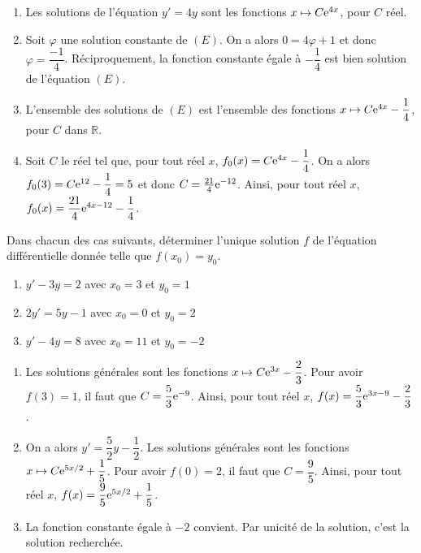 \documentclass[11pt,fleqn, openany]{book} %
\begin{document}
\begin{solution}\hspace{0pt}
\begin{enumerate}\item Les solutions de l'équation \(y'=4y\) sont les fonctions \(x\mapsto C\mathrm{e}^{4x}\), pour \(C\) réel.
	\item Soit \(\varphi\) une solution constante de \((E)\). On a alors \(0 = 4 \varphi + 1\) et donc \(\varphi= \dfrac{-1}{4}\). Réciproquement, la fonction constante égale à \(-\dfrac{1}{4}\) est bien solution de l'équation \((E)\).
	\item L'ensemble des solutions de \((E)\) est l'ensemble des fonctions \(x\mapsto C\mathrm{e}^{4x}-\dfrac{1}{4}\), pour \(C\) dans \(\mathbb{R}\).
	\item Soit \(C\) le réel tel que, pour tout réel \(x\), \(f_0(x)=C\mathrm{e}^{4x}-\dfrac{1}{4}\). On a alors \(f_0(3)=C\mathrm{e}^{12}-\dfrac{1}{4}=5\) et donc \(C=\frac{21}{4}\mathrm{e}^{-12}\). Ainsi, pour tout réel \(x\), \(f_0(x)=\dfrac{21}{4}\mathrm{e}^{4x-12}-\dfrac{1}{4}\).\end{enumerate}
\end{solution}



\begin{exercise}[topic=diff03]Dans chacun des cas suivants, déterminer l'unique solution $f$ de l'équation différentielle donnée telle que $f(x_0)=y_0$.

\begin{enumerate}
\item $y'-3y=2$ avec $x_0=3$ et $y_0=1$
\item $2y'=5y-1$ avec $x_0=0$ et $y_0=2$
\item $y'-4y=8$ avec $x_0=11$ et $y_0=-2$
\end{enumerate}\end{exercise}

\begin{solution}\hspace{0pt}
\begin{enumerate}\item Les solutions générales sont les fonctions \(x\mapsto C\mathrm{e}^{3x}-\dfrac{2}{3}\). Pour avoir \(f(3)=1\), il faut que \(C=\dfrac{5}{3}\mathrm{e}^{-9}\). Ainsi, pour tout réel \(x\), \(f(x)=\dfrac{5}{3}\mathrm{e}^{3x-9}-\dfrac{2}{3}\).
\vskip5pt
\item On a alors \(y'=\dfrac{5}{2}y-\dfrac{1}{2}\).  Les solutions générales sont les fonctions \(x\mapsto C\mathrm{e}^{5x/2}+\dfrac{1}{5}\). Pour avoir \(f(0)=2\), il faut que \(C=\dfrac{9}{5}\). Ainsi, pour tout réel \(x\), \(f(x)=\dfrac{9}{5}\mathrm{e}^{5x/2}+\dfrac{1}{5}\).
\vskip5pt
\item La fonction constante égale à \(-2\) convient. Par unicité de la solution, c'est la solution recherchée.\end{enumerate}

 \end{solution}
 
\end{document}
